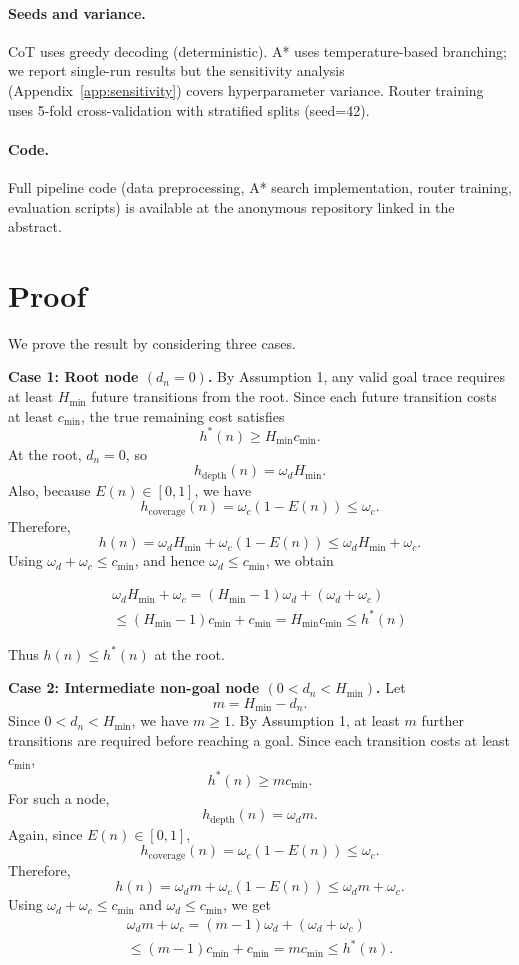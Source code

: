 \documentclass{article}
\begin{document}
\paragraph{Seeds and variance.} CoT uses greedy decoding (deterministic). A* uses temperature-based branching; we report single-run results but the sensitivity analysis (Appendix~\ref{app:sensitivity}) covers hyperparameter variance. Router training uses 5-fold cross-validation with stratified splits (seed=42).

\paragraph{Code.} Full pipeline code (data preprocessing, A* search implementation, router training, evaluation scripts) is available at the anonymous repository linked in the abstract.




\section{Proof}\label{full-proof}

We prove the result by considering three cases.

\textbf{Case 1: Root node \((d_n=0)\).}
By Assumption 1, any valid goal trace requires at least \(H_{\min}\) future transitions from the root. Since each future transition costs at least \(c_{\min}\), the true remaining cost satisfies
\[
h^*(n) \geq H_{\min}c_{\min}.
\]
At the root, \(d_n=0\), so
\[
h_{\mathrm{depth}}(n)=\omega_d H_{\min}.
\]
Also, because \(E(n)\in[0,1]\), we have
\[
h_{\mathrm{coverage}}(n)=\omega_c(1-E(n)) \leq \omega_c.
\]
Therefore,
\[
h(n) = \omega_d H_{\min} + \omega_c(1-E(n))
      \leq \omega_d H_{\min} + \omega_c.
\]
Using \(\omega_d+\omega_c \leq c_{\min}\), and hence \(\omega_d \leq c_{\min}\), we obtain


\begin{multline}
    \omega_d H_{\min} + \omega_c
= (H_{\min}-1)\omega_d + (\omega_d+\omega_c) \\
\leq (H_{\min}-1)c_{\min}+c_{\min}
= H_{\min}c_{\min}
\leq h^*(n)
\end{multline}


Thus \(h(n)\leq h^*(n)\) at the root.

\textbf{Case 2: Intermediate non-goal node \((0<d_n<H_{\min})\).}
Let
\[
m = H_{\min}-d_n.
\]
Since \(0<d_n<H_{\min}\), we have \(m\geq 1\). By Assumption 1, at least \(m\) further transitions are required before reaching a goal. Since each transition costs at least \(c_{\min}\),
\[
h^*(n) \geq m c_{\min}.
\]
For such a node,
\[
h_{\mathrm{depth}}(n)=\omega_d m.
\]
Again, since \(E(n)\in[0,1]\),
\[
h_{\mathrm{coverage}}(n)=\omega_c(1-E(n))\leq \omega_c.
\]
Therefore,
\[
h(n)=\omega_d m+\omega_c(1-E(n))
\leq \omega_d m+\omega_c.
\]
Using \(\omega_d+\omega_c\leq c_{\min}\) and \(\omega_d\leq c_{\min}\), we get
\begin{multline}
    \omega_d m+\omega_c
= (m-1)\omega_d+(\omega_d+\omega_c) \\
\leq (m-1)c_{\min}+c_{\min}
= m c_{\min}
\leq h^*(n).
\end{multline}
\end{document}

